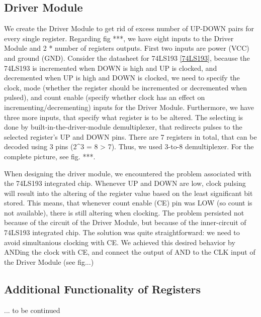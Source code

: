 \subsection{Driver Module}
We create the Driver Module to get rid of excess number of UP-DOWN pairs for every single register. Regarding fig ***, we have eight inputs to the Driver Module and 2 * number of registers outputs. First two inputs are power (VCC) and ground (GND). Consider the datasheet for 74LS193 \ref{74LS193}, because the 74LS193 is incremented when DOWN is high and UP is clocked, and decremented when UP is high and DOWN is clocked, we need to specify the clock, mode (whether the register should be incremented or decremented when pulsed), and count enable (specify whether clock has an effect on incrementing/decrementing) inputs for the Driver Module. Furthermore, we have three more inputs, that specify what register is to be altered. The selecting is done by built-in-the-driver-module demultiplexer, that redirects pulses to the selected register's UP and DOWN pins. There are 7 registers in total, that can be decoded using 3 pins (2^3 = 8 > 7). Thus, we used 3-to-8 demultiplexer. For the complete picture, see fig. ***.

When designing the driver module, we encountered the problem associated with the 74LS193 integrated chip. Whenever UP and DOWN are low, clock pulsing will result into the altering of the register value based on the least significant bit stored. This means, that whenever count enable (CE) pin was LOW (so count is not available), there is still altering when clocking. The problem persisted not because of the circuit of the Driver Module, but because of the inner-circuit of 74LS193 integrated chip. The solution was quite straightforward: we need to avoid simultanious clocking with CE. We achieved this desired behavior by ANDing the clock with CE, and connect the output of AND to the CLK input of the Driver Module (see fig...)

\subsection{Additional Functionality of Registers}
... to be continued
 